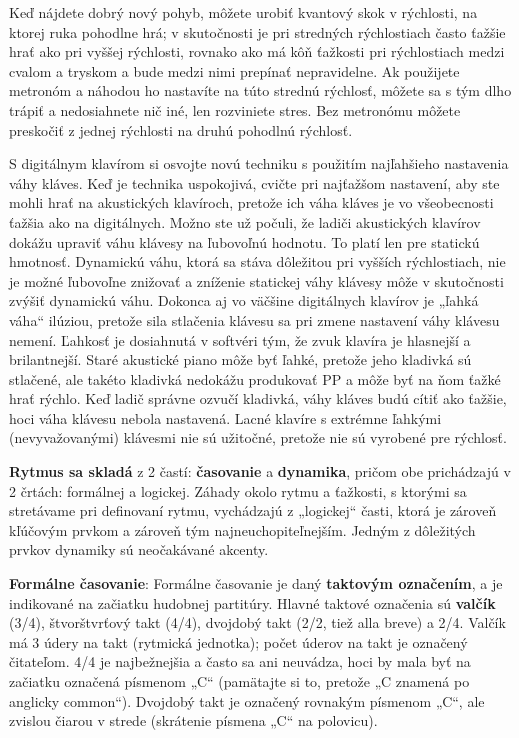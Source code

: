 \documentclass[11pt,a4paper]{book}
\begin{document}
Keď nájdete dobrý nový pohyb, môžete urobiť kvantový skok v rýchlosti, na ktorej ruka pohodlne hrá; v skutočnosti je pri stredných rýchlostiach často ťažšie hrať ako pri vyššej rýchlosti, rovnako ako má kôň ťažkosti pri rýchlostiach medzi cvalom a tryskom a bude medzi nimi prepínať nepravidelne. Ak použijete metronóm a náhodou ho nastavíte na túto strednú rýchlosť, môžete sa s tým dlho trápiť a nedosiahnete nič iné, len rozviniete stres. Bez metronómu môžete preskočiť z jednej rýchlosti na druhú pohodlnú rýchlosť.

S digitálnym klavírom si osvojte novú techniku s použitím najľahšieho nastavenia váhy kláves. Keď je technika uspokojivá, cvičte pri najťažšom nastavení, aby ste mohli hrať na akustických klavíroch, pretože ich váha kláves je vo všeobecnosti ťažšia ako na digitálnych. Možno ste už počuli, že ladiči akustických klavírov dokážu upraviť váhu klávesy na ľubovoľnú hodnotu. To platí len pre statickú hmotnosť. Dynamickú váhu, ktorá sa stáva dôležitou pri vyšších rýchlostiach, nie je možné ľubovoľne znižovať a zníženie statickej váhy klávesy môže v skutočnosti zvýšiť dynamickú váhu. Dokonca aj vo väčšine digitálnych klavírov je „ľahká váha“ ilúziou, pretože sila stlačenia klávesu sa pri zmene nastavení váhy klávesu nemení. Ľahkosť je dosiahnutá v softvéri tým, že zvuk klavíra je hlasnejší a brilantnejší. Staré akustické piano môže byť ľahké, pretože jeho kladivká sú stlačené, ale takéto kladivká nedokážu produkovať PP a môže byť na ňom ťažké hrať rýchlo. Keď ladič správne ozvučí kladivká, váhy kláves budú cítiť ako ťažšie, hoci váha klávesu nebola nastavená. Lacné klavíre s extrémne ľahkými (nevyvažovanými) klávesmi nie sú užitočné, pretože nie sú vyrobené pre rýchlosť.

\textbf{Rytmus sa skladá} z 2 častí: \textbf{časovanie} a \textbf{dynamika}, pričom obe prichádzajú v 2 črtách: formálnej a logickej. Záhady okolo rytmu a ťažkosti, s ktorými sa stretávame pri definovaní rytmu, vychádzajú z „logickej“ časti, ktorá je zároveň kľúčovým prvkom a zároveň tým najneuchopiteľnejším. Jedným z dôležitých prvkov dynamiky sú neočakávané akcenty.

\textbf{Formálne časovanie}: Formálne časovanie je daný \textbf{taktovým označením}, a je indikované na začiatku hudobnej partitúry. Hlavné taktové označenia sú \textbf{valčík} (3/4), štvorštvrťový takt (4/4), dvojdobý takt (2/2, tiež alla breve) a 2/4.       
Valčík má 3 údery na takt (rytmická jednotka); počet úderov na takt je označený čitateľom. 4/4 je najbežnejšia a často sa ani neuvádza, hoci by mala byť na začiatku označená písmenom „C“ (pamätajte si to, pretože „C znamená po anglicky common“). Dvojdobý takt je označený rovnakým písmenom „C“, ale zvislou čiarou v strede (skrátenie písmena „C“ na polovicu).
\end{document}
